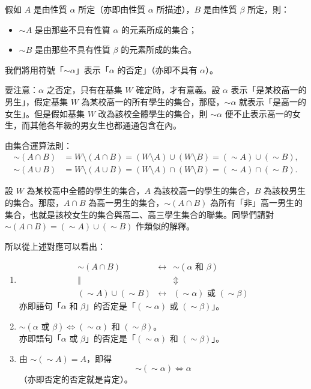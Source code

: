假如 $A$ 是由性質 $\alpha$ 所定（亦即由性質 $\alpha$ 所描述），$B$ 是由性質 $\beta$ 所定，則：
\begin{itemize}
  \item $\sim A$ 是由那些不具有性質 $\alpha$ 的元素所成的集合；
  \item $\sim B$ 是由那些不具有性質 $\beta$ 的元素所成的集合。
\end{itemize}
我們將用符號「$\sim \alpha$」表示「$\alpha$ 的否定」（亦即不具有 $\alpha$）。

要注意：$\alpha$ 之否定，只有在基集 $W$ 確定時，才有意義。設 $\alpha$ 表示「是某校高一的男生」，假定基集 $W$ 為某校高一的所有學生的集合，那麼，$\sim \alpha$ 就表示「是高一的女生」。但是假如基集 $W$ 改為該校全體學生的集合，則 $\sim \alpha$ 便不止表示高一的女生，而其他各年級的男女生也都通通包含在內。

由集合運算法則：
\begin{align*}
  \sim(A \cap B) &= W \setminus (A \cap B) = (W \setminus A) \cup (W \setminus B) = (\sim A) \cup (\sim B), \\
  \sim(A \cup B) &= W \setminus (A \cup B) = (W \setminus A) \cap (W \setminus B) = (\sim A) \cap (\sim B).
\end{align*}

\begin{example}\label{ex:2-4-8}
設 $W$ 為某校高中全體的學生的集合，$A$ 為該校高一的學生的集合，$B$ 為該校男生的集合。那麼，$A \cap B$ 為高一男生的集合，$\sim(A \cap B)$ 為所有「非」高一男生的集合，也就是該校女生的集合與高二、高三學生集合的聯集。同學們請對 $\sim(A \cap B) = (\sim A) \cup (\sim B)$ 作類似的解釋。
\end{example}

所以從上述對應可以看出：
\begin{enumerate}[(1)]
  \item
  \[
    \begin{array}{ccc}
      \sim(A \cap B) & \longleftrightarrow & \sim(\alpha \text{ 和 } \beta) \\
      \Vert & & \Updownarrow \\
      (\sim A) \cup (\sim B) & \longleftrightarrow & (\sim \alpha) \text{ 或 } (\sim \beta)
    \end{array}
  \]
  亦即語句「$\alpha$ 和 $\beta$」的否定是「$(\sim \alpha)$ 或 $(\sim \beta)$」。
  \item $\sim(\alpha \text{ 或 } \beta) \iff (\sim \alpha) \text{ 和 } (\sim \beta)$。\\
  亦即語句「$\alpha$ 或 $\beta$」的否定是「$(\sim \alpha)$ 和 $(\sim \beta)$」。
  \item 由 $\sim(\sim A) = A$，即得
  \begin{equation}\label{eq:double_negation}
    \sim(\sim \alpha) \iff \alpha
  \end{equation}
  （亦即否定的否定就是肯定）。
\end{enumerate}

